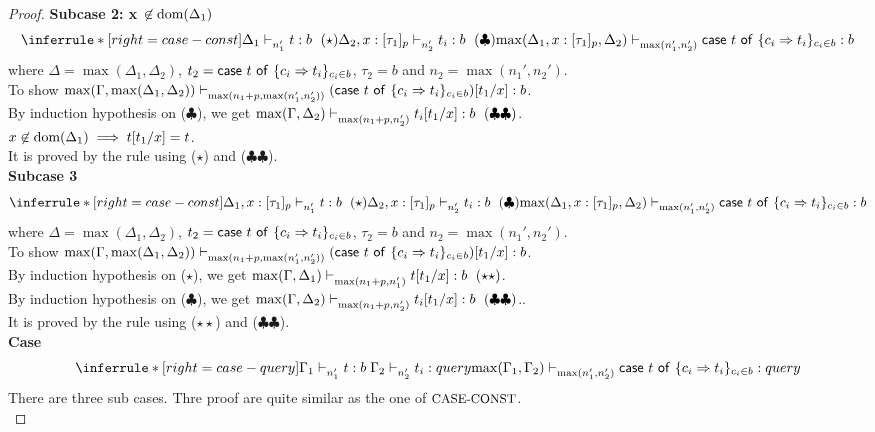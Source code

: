 \documentclass{article}
\begin{document}
\begin{proof}
\textbf{Subcase 2: x $\not \in \text{dom}(\Delta_1)$ }
\[
     \inferrule*[ right = case-const ]
   {\Delta_1 \jtype{n_1'}{}{t}{b}~(\star) \\ \Delta_2, x: [\tau_1]_p \jtype{n_2'}{}{t_i}{b}~(\clubsuit) }
   {\max(\Delta_1, x: [\tau_1]_p, \Delta_2) \jtype{\max(n_1',n_2')}{}{\tcaseof{t}\ \{c_i \Rightarrow t_i\}_{c_i \in b} } {b} }
\]
where $\Delta = \max(\Delta_1, \Delta_2)$, $t_2 =\mathsf{case}~t~\mathsf{of}\ \{c_i \Rightarrow t_i\}_{c_i \in b}$, $\tau_2 = b$ and $n_2 = \max(n_1', n_2')$.\\ 
To show $ \max(\Gamma, \max(\Delta_1,\Delta_2) ) \mathrel{\vdash_{\max(n_1 + p,\max(n_1',n_2') )}^{} {  (\mathsf{case}~t~\mathsf{of}\ \{c_i \Rightarrow t_i\}_{c_i \in b})[t_1/x] } : {b}}  $. \\
By induction hypothesis on ($\clubsuit$), we get $\max(\Gamma, \Delta_2) \mathrel{\vdash_{\max(n_1 + p, n_2') }^{} {t_i[t_1/x]} : {b}}~(\clubsuit\clubsuit) $. \\
 $x \not \in \text{dom}(\Delta_1) \implies t[t_1/x] = t $.\\
It is proved by the rule  using ($\star$) and ($\clubsuit\clubsuit$). \\

\textbf{Subcase 3 }
\[
    \inferrule*[ right = case-const ]
   {\Delta_1, x: [\tau_1]_p \jtype{n_1'}{}{t}{b}~(\star) \\ \Delta_2, x: [\tau_1]_p \jtype{n_2'}{}{t_i}{b}~(\clubsuit) }
   {\max(\Delta_1, x: [\tau_1]_p, \Delta_2) \jtype{\max(n_1',n_2')}{}{\tcaseof{t}\ \{c_i \Rightarrow t_i\}_{c_i \in b} } {b} }
\]
where $\Delta = \max(\Delta_1, \Delta_2)$, $t_2 =\mathsf{case}~t~\mathsf{of}\ \{c_i \Rightarrow t_i\}_{c_i \in b}$, $\tau_2 = b$ and $n_2 = \max(n_1', n_2')$.\\ 
To show $ \max(\Gamma, \max(\Delta_1,\Delta_2) ) \mathrel{\vdash_{\max(n_1 + p,\max(n_1',n_2') )}^{} {  (\mathsf{case}~t~\mathsf{of}\ \{c_i \Rightarrow t_i\}_{c_i \in b})[t_1/x] } : {b}}  $. \\
By induction hypothesis on ($\star$), we get $\max(\Gamma, \Delta_1) \jtype{\max(n_1 + p, n_1') }{}{t[t_1/x]}{b}~(\star\star) $. \\
By induction hypothesis on ($\clubsuit$), we get $\max(\Gamma, \Delta_2) \mathrel{\vdash_{\max(n_1 + p, n_2') }^{} {t_i[t_1/x]} : {b}}~(\clubsuit\clubsuit) $.. \\
It is proved by the rule  using ($\star\star$) and ($\clubsuit\clubsuit$).\\



\noindent \textbf{Case} 
\[
    \inferrule*[ right = case-query]
   {\Gamma_1 \jtype{n_1'}{}{t}{b} \\ \Gamma_2 \jtype{n_2'}{}{t_i}{query} }
   {\max(\Gamma_1, \Gamma_2) \jtype{\max(n_1',n_2')}{}{\tcaseof{t}\ \{c_i \Rightarrow t_i\}_{c_i \in b} } {query} }
\]
There are three sub cases. Thre proof are quite similar as the one of $\mbox{\small{CASE-CONST}}$.\\


\end{proof}
\end{document}
